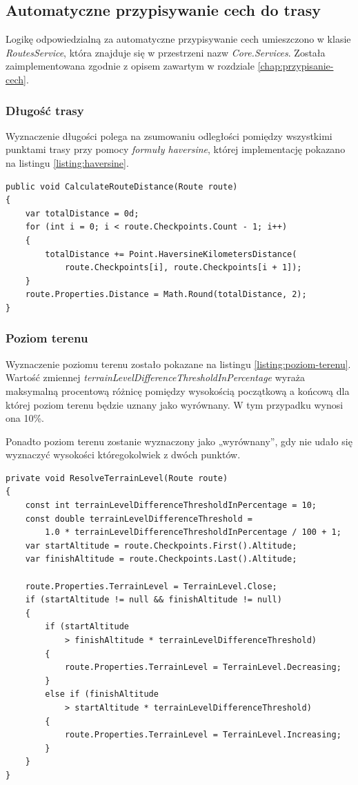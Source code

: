 \subsection{Automatyczne przypisywanie cech do trasy}
Logikę odpowiedzialną za automatyczne przypisywanie cech umieszczono w klasie \textit{RoutesService}, która znajduje się w przestrzeni nazw \textit{Core.Services}. Została zaimplementowana zgodnie z opisem zawartym w rozdziale \ref{chap:przypisanie-cech}.
\subsubsection{Długość trasy}
Wyznaczenie długości polega na zsumowaniu odległości pomiędzy wszystkimi punktami trasy przy pomocy \textit{formuły haversine}, której implementację pokazano na listingu \ref{listing:haversine}.
\begin{lstlisting}[caption={Wyznaczenie długości trasy},label=listing:dlugosc-trasy]
public void CalculateRouteDistance(Route route)
{
    var totalDistance = 0d;
    for (int i = 0; i < route.Checkpoints.Count - 1; i++)
    {
        totalDistance += Point.HaversineKilometersDistance(
        	route.Checkpoints[i], route.Checkpoints[i + 1]);
    }
    route.Properties.Distance = Math.Round(totalDistance, 2);
}
\end{lstlisting}
\subsubsection{Poziom terenu}
Wyznaczenie poziomu terenu zostało pokazane na listingu \ref{listing:poziom-terenu}. Wartość zmiennej \textit{terrainLevelDifferenceThresholdInPercentage} wyraża maksymalną procentową różnicę pomiędzy wysokością początkową a końcową dla której poziom terenu będzie uznany jako wyrównany. W tym przypadku wynosi ona 10\%.

Ponadto poziom terenu zostanie wyznaczony jako „wyrównany”, gdy nie udało się wyznaczyć wysokości któregokolwiek z dwóch punktów.
\begin{lstlisting}[caption={Wyznaczenie poziomu terenu},label=listing:poziom-terenu]
private void ResolveTerrainLevel(Route route)
{
    const int terrainLevelDifferenceThresholdInPercentage = 10;
    const double terrainLevelDifferenceThreshold =
    	1.0 * terrainLevelDifferenceThresholdInPercentage / 100 + 1;
    var startAltitude = route.Checkpoints.First().Altitude;
    var finishAltitude = route.Checkpoints.Last().Altitude;

    route.Properties.TerrainLevel = TerrainLevel.Close;
    if (startAltitude != null && finishAltitude != null)
    {
        if (startAltitude 
        	> finishAltitude * terrainLevelDifferenceThreshold)
        {
            route.Properties.TerrainLevel = TerrainLevel.Decreasing;
        }
        else if (finishAltitude 
        	> startAltitude * terrainLevelDifferenceThreshold)
        {
            route.Properties.TerrainLevel = TerrainLevel.Increasing;
        }
    }
}
\end{lstlisting}

